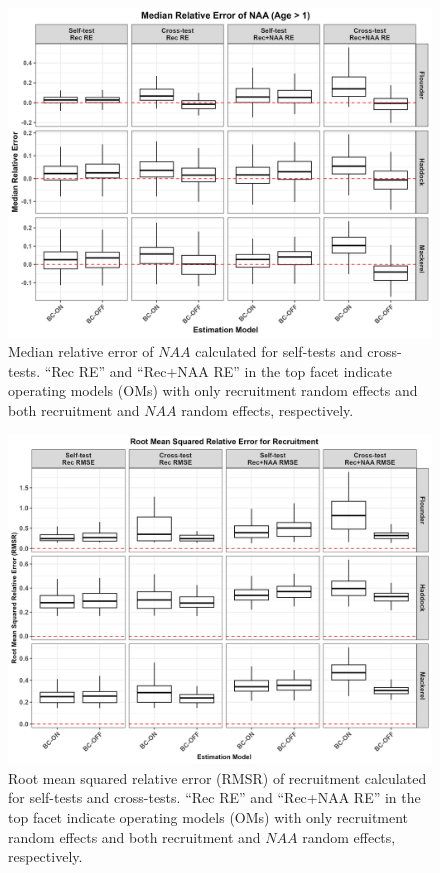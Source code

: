 \documentclass[
  12pt,
]{article}
\begin{document}
\begin{figure}[H]
    \centering
    \includegraphics[width=\textwidth]{Revised_Figures&Tables/Median_NAA.PNG}
    \caption{Median relative error of $NAA$ calculated for self-tests and cross-tests. ``Rec RE'' and ``Rec+NAA RE'' in the top facet indicate operating models (OMs) with only recruitment random effects and both recruitment and $NAA$ random effects, respectively.}
    \label{fig:supp_Median_NAA}
\end{figure}

\begin{figure}[H]
    \centering
    \includegraphics[width=\textwidth]{Revised_Figures&Tables/RMSR_Rec.PNG}
    \caption{Root mean squared relative error (RMSR) of recruitment calculated for self-tests and cross-tests. ``Rec RE'' and ``Rec+NAA RE'' in the top facet indicate operating models (OMs) with only recruitment random effects and both recruitment and $NAA$ random effects, respectively.}
    \label{fig:supp_Rec_RMSR}
\end{figure}
\end{document}
